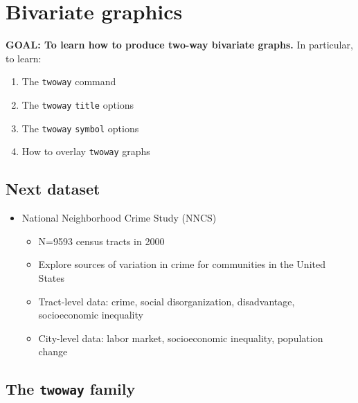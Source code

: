 \documentclass[
]{book}
\providecommand{\tightlist}{%
  \setlength{\itemsep}{0pt}\setlength{\parskip}{0pt}}
\begin{document}
\hypertarget{bivariate-graphics}{%
\section{Bivariate graphics}\label{bivariate-graphics}}

\begin{alert}

\textbf{GOAL: To learn how to produce two-way bivariate graphs.} In particular, to learn:

\begin{enumerate}
\def\labelenumi{\arabic{enumi}.}
\tightlist
\item
  The \texttt{twoway} command
\item
  The \texttt{twoway} \texttt{title} options
\item
  The \texttt{twoway} \texttt{symbol} options
\item
  How to overlay \texttt{twoway} graphs
\end{enumerate}

\end{alert}

\hypertarget{next-dataset}{%
\subsection{Next dataset}\label{next-dataset}}

\begin{itemize}
\tightlist
\item
  National Neighborhood Crime Study (NNCS)

  \begin{itemize}
  \tightlist
  \item
    N=9593 census tracts in 2000
  \item
    Explore sources of variation in crime for communities in the United States
  \item
    Tract-level data: crime, social disorganization, disadvantage, socioeconomic inequality
  \item
    City-level data: labor market, socioeconomic inequality, population change
  \end{itemize}
\end{itemize}

\hypertarget{the-twoway-family}{%
\subsection{\texorpdfstring{The \texttt{twoway} family}{The twoway family}}\label{the-twoway-family}}
\end{document}
